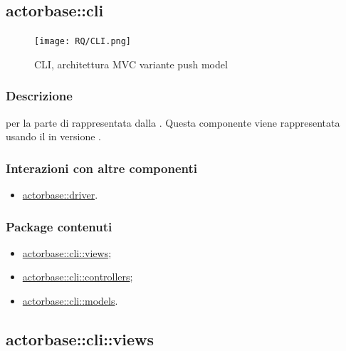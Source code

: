 \documentclass{scalatekids-article}
\begin{document}

\subsection{actorbase::cli}
\label{sec:actorbase::cli}

\begin{figure}[H]
  \begin{center}
    \texttt{[image: RQ/CLI.png]}
    \caption{CLI, architettura MVC variante push model}
  \end{center}
\end{figure}

\subsubsection{Descrizione}

 per la parte di  rappresentata dalla .
Questa componente viene rappresentata usando il 
 in versione .

\subsubsection{Interazioni con altre componenti}

\begin{itemize}
\item \hyperref[sec:actorbase::driver]{actorbase::driver}.
\end{itemize}

\subsubsection{Package contenuti}

\begin{itemize}
\item \hyperref[sec:actorbase::cli::views]{actorbase::cli::views};
\item \hyperref[sec:actorbase::cli::controllers]{actorbase::cli::controllers};
\item \hyperref[sec:actorbase::cli::models]{actorbase::cli::models}.
\end{itemize}

\subsection{actorbase::cli::views}
\label{sec:actorbase::cli::views}
\end{document}
